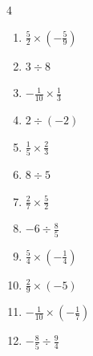 \begin{multicols}{4}
\begin{enumerate}
  \item $\displaystyle \frac{5}{2}\times{}\left(-\frac{5}{9}\right)$


  \item $\displaystyle 3\div{}8$


  \item $\displaystyle -\frac{1}{10}\times{}\frac{1}{3}$


  \item $\displaystyle 2\div{}\left(-2\right)$

        \phantom{$\displaystyle =-1$}

  \item $\displaystyle \frac{1}{5}\times{}\frac{2}{3}$


  \item $\displaystyle 8\div{}5$


\columnbreak %

\resetques

  \item $\displaystyle \frac{2}{7}\times{}\frac{5}{2}$


  \item $\displaystyle -6\div{}\frac{8}{5}$


  \item $\displaystyle \frac{5}{4}\times{}\left(-\frac{1}{4}\right)$


  \item $\displaystyle \frac{2}{9}\times{}\left(-5\right)$


  \item $\displaystyle -\frac{1}{10}\times{}\left(-\frac{1}{7}\right)$


  \item $\displaystyle -\frac{8}{5}\div{}\frac{9}{4}$


\end{enumerate}
\end{multicols}
